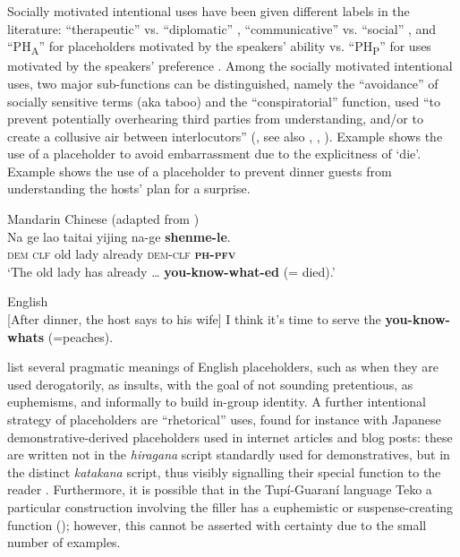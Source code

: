 \documentclass[output=paper]{langscibook}
\begin{document}
Socially motivated intentional uses have been given different labels in the literature: “therapeutic” vs. “diplomatic” \citep{Tarnyikova2019}, “communicative” vs. “social” \citep{Seraku2020}, and “PH\textsubscript{A}” for placeholders motivated by the speakers’ ability vs. “PH\textsubscript{P}” for uses motivated by the speakers’ preference \citep{Seraku2024}. Among the socially motivated intentional uses, two major sub-functions can be distinguished, namely the  “avoidance” of socially sensitive terms (aka taboo) and the “conspiratorial” function, used “to prevent potentially overhearing third parties from understanding, and/or to create a collusive air between interlocutors” (\citealt[106]{Enfield2003}, see also \citealt[501--507]{Hayashi2006}, \citealt{Keevallik2010}, \citealt{Cheung2015}). Example  shows the use of a placeholder to avoid embarrassment due to the explicitness of ‘die’. Example  shows the use of a placeholder to prevent dinner guests from understanding the hosts’ plan for a surprise.

\ea\label{ex:intro:18}
{Mandarin Chinese (adapted from \citealt[276]{Cheung2015})}\\
\gll Na ge lao taitai yijing na-ge \textbf{shenme-le}.\\
     \textsc{dem} \textsc{clf} old lady already \textsc{dem}-\textsc{clf} \textsc{\textbf{ph-pfv}}\\
\glt ‘The old lady has already … \textbf{you-know-what-ed} (= died).’
\z

\ea\label{ex:intro:19}
{English \citep[106]{Enfield2003}}\\
 \textup{[After dinner, the host says to his wife]} I think it’s time to serve the \textbf{you-know-whats} (=peaches).\\
 \z

\citet{Palacios_martinez2015} list several pragmatic meanings of English placeholders, such as when they are used derogatorily, as insults, with the goal of not sounding pretentious, as euphemisms, and informally to build in-group identity. A further intentional strategy of placeholders are “rhetorical” uses, found for instance with Japanese demonstrative-derived placeholders used in internet articles and blog posts: these are written not in the \textit{hiragana} script standardly used for demonstratives, but in the distinct \textit{katakana} script, thus visibly signalling their special function to the reader \citep{Seraku2022a}. Furthermore, it is possible that in the Tupí-Guaraní language Teko a particular construction involving the filler has a euphemistic or suspense-creating function (\citealt{chapters/rose}); however, this cannot be asserted with certainty due to the small number of examples. 
\end{document}
